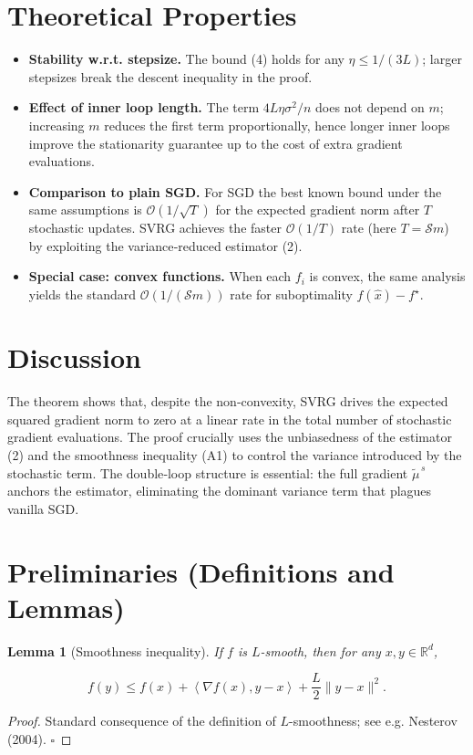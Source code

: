 \documentclass{article}
\newtheorem{lemma}{Lemma}
\newcommand{\inner}[2]{\left\langle #1,#2\right\rangle}
\begin{document}
\section*{Theoretical Properties}
\begin{itemize}
\item \textbf{Stability w.r.t. stepsize.}  The bound (4) holds for any \(\eta\le 1/(3L)\);
larger stepsizes break the descent inequality in the proof.
\item \textbf{Effect of inner loop length.}  The term \(4L\eta\sigma^{2}/n\) does not depend on \(m\); increasing \(m\) reduces the first term proportionally, hence longer inner loops improve the stationarity guarantee up to the cost of extra gradient evaluations.
\item \textbf{Comparison to plain SGD.}  For SGD the best known bound under the same assumptions is
\(\mathcal{O}(1/\sqrt{T})\) for the expected gradient norm after \(T\) stochastic updates.
SVRG achieves the faster \(\mathcal{O}(1/T)\) rate (here \(T=\mathcal{S}m\)) by exploiting the variance‑reduced estimator (2).
\item \textbf{Special case: convex functions.}  When each \(f_i\) is convex, the same analysis yields the standard
\(\mathcal{O}(1/( \mathcal{S}m))\) rate for suboptimality \(f(\hat{x})-f^\star\).
\end{itemize}

\section*{Discussion}
The theorem shows that, despite the non‑convexity, SVRG drives the expected squared gradient norm to zero at a linear rate in the total number of stochastic gradient evaluations.  The proof crucially uses the unbiasedness of the estimator (2) and the smoothness inequality (A1) to control the variance introduced by the stochastic term.  The double‑loop structure is essential: the full gradient \(\tilde{\mu}^{\,s}\) anchors the estimator, eliminating the dominant variance term that plagues vanilla SGD.

\section*{Preliminaries (Definitions and Lemmas)}
\begin{lemma}[Smoothness inequality]\label{lem:smooth}
If \(f\) is \(L\)-smooth, then for any \(x,y\in\mathbb{R}^{d}\),

\[
f(y) \le f(x) + \inner{\nabla f(x)}{y-x}
          + \frac{L}{2}\|y-x\|^{2}.
\tag{L1}
\]
\end{lemma}
\begin{proof}
Standard consequence of the definition of \(L\)-smoothness; see e.g. Nesterov (2004). \(\square\)
\end{proof}
\end{document}
